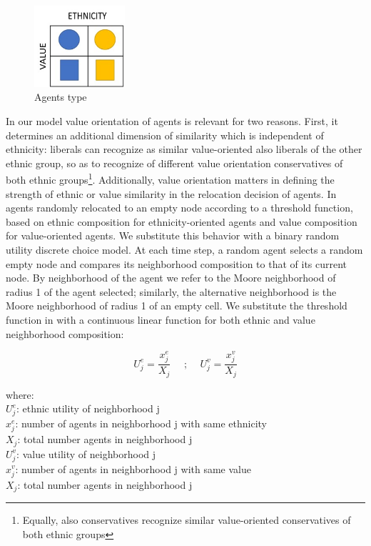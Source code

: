 \documentclass{article}
\begin{document}
\begin{figure}[H]
    \centering
    \includegraphics[width=0.3\textwidth]{material/figures/model.jpg}
    \caption{Agents type}
    \label{fig:model}
\end{figure}

In our model value orientation of agents is relevant for two reasons. First, it determines an additional dimension of similarity which is independent of ethnicity: liberals can recognize as similar value-oriented also liberals of the other ethnic group, so as to recognize of different value orientation conservatives of both ethnic groups\footnote{Equally, also conservatives recognize similar value-oriented conservatives of both ethnic groups}. Additionally, value orientation matters in defining the strength of ethnic or value similarity in the relocation decision of agents.
In \textcite{paolillo2018} agents randomly relocated to an empty node according to a threshold function, based on ethnic composition for ethnicity-oriented agents and value composition for value-oriented agents. We substitute this behavior with a binary random utility discrete choice model. At each time step, a random agent selects a random empty node and compares its neighborhood composition to that of its current node. By neighborhood of the agent we refer to the Moore neighborhood of radius 1 of the agent selected; similarly, the alternative neighborhood is the Moore neighborhood of radius 1 of an empty cell. We substitute the threshold function in \textcite{paolillo2018} with a continuous linear function for both ethnic and value neighborhood composition:

\begin{equation}
   U^e_j = \frac{x^e_j}{X_j} \quad\text{    ;   }\quad   U^v_j = \frac{x^v_j}{X_j}
\end{equation}

where:\\
$U^e_j$: ethnic utility of neighborhood j \\
$x^e_j$: number of agents in neighborhood j with same ethnicity \\
$X_j$: total number agents in neighborhood j\\
$U^v_j$: value utility of neighborhood j \\
$x^v_j$: number of agents in neighborhood j with same value \\
$X_j$: total number agents in neighborhood j\\
\end{document}
